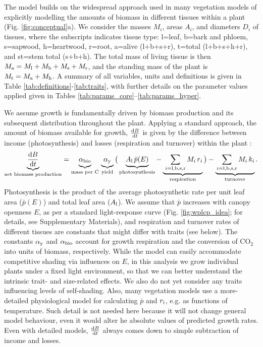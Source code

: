 \documentclass[a4paper,11pt]{article}
\begin{document}
The {\plant} model builds on the widespread approach used in many vegetation models of explicitly modelling the amounts of biomass in different tissues within a plant \citep[e.g.][]{Givnish-1988, Makela-1997, Moorcroft-2001, Sitch-2008, Falster-2011, King-2011, DeKauwe-2014} (Fig. \ref{fig:conceptual}a). We consider the masses $M_i$, areas $A_i$, and diameters $D_i$ of tissues, where the subscripts indicates tissue type: l=leaf, b=bark and phloem, s=sapwood, h=heartwood, r=root, a=alive (l+b+s+r), t=total (l+b+s+h+r), and st=stem total (s+b+h). The total mass of living tissue is then $M_{\rm a}=M_{\rm l}+M_{\rm b}+M_{\rm s}+M_{\rm r}$, and the standing mass of the plant is $M_{\rm t}=M_{\rm a}+M_{\rm h}$. A summary of all variables, units and definitions is given in Table \ref{tab:definitions}-\ref{tab:traits}, with further details on the parameter values applied given in Tables \ref{tab:params_core}--\ref{tab:params_hyper}.

We assume growth is fundamentally driven by biomass production and its subsequent distribution throughout the plant. Applying a standard approach, the amount of biomass available for growth, $\frac{{\rm d}B}{{\rm d}t}$ is given by the difference between income (photosynthesis) and losses (respiration and turnover) within the plant \citep{Makela-1997, Thornley-2000}:
\begin{equation}\label{eq:dbdt}
\underbrace{\strut \frac{{\rm d}B}{{\rm d}t}}_\textrm{net biomass production}
= \underbrace{\strut \alpha_{\rm bio} }_\textrm{mass per C} \,
\underbrace{\strut \alpha_{\rm y} }_\textrm{yield}
\big( \underbrace{\strut A_{\rm l} \, \bar{p}(E)}_\textrm{photosynthesis} -
\underbrace{\strut \, \sum_{i = {\rm l}, {\rm b}, {\rm s}, {\rm r}}{M_i \, r_i}}_\textrm{respiration}\big)
- \underbrace{\strut \sum_{i = {\rm l}, {\rm b}, {\rm s},  {\rm r}}{M_i \, k_i}}_\textrm{turnover}.
\end{equation}
Photosynthesis is the product of the average photosynthetic rate per unit leaf area ($\bar{p}(E)$) and total leaf area ($A_{\rm l}$). We assume that $\bar{p}$ increases with canopy openness $E$, as per a standard light-response curve (Fig. \ref{fig:wplcp_idea}; for details, see Supplementary Materials), and respiration and turnover rates of different tissues are constants that might differ with traits (see below). The constants $\alpha_{\rm y}$ and $\alpha_{\rm bio}$ account for growth respiration and the conversion of CO$_2$ into units of biomass, respectively. While the {\plant} model can easily accommodate competitive shading via influences on $E$, in this analysis we grow individual plants under a fixed light environment, so that we can better understand the intrinsic trait- and size-related effects. We also do not yet consider any traits influencing levels of self-shading. Also, many vegetation models use a more-detailed physiological model for calculating $\bar{p}$ and $r_{\rm i}$, e.g. as functions of temperature. Such detail is not needed here because it will not change general model behaviour, even it would alter  he absolute values of predicted growth rates. Even with detailed models, $\frac{{\rm d}B}{{\rm d}t}$ always comes down to simple subtraction of income and losses.
\end{document}
